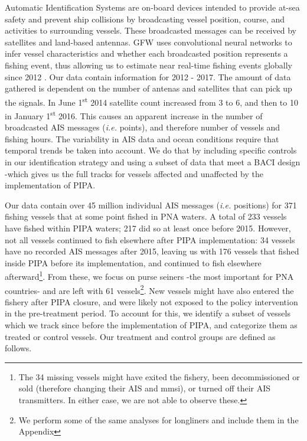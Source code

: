 \documentclass[11pt,]{article}
\let\rmarkdownfootnote\footnote%
\def\footnote{\protect\rmarkdownfootnote}
\begin{document}
Automatic Identification Systems are on-board devices intended to
provide at-sea safety and prevent ship collisions by broadcasting vessel
position, course, and activities to surrounding vessels. These
broadcasted messages can be received by satellites and land-based
antennas. GFW uses convolutional neural networks to infer vessel
characteristics and whether each broadcasted position represents a
fishing event, thus allowing us to estimate near real-time fishing
events globally since 2012 \citep{kroodsma_2018}. Our data contain
information for 2012 - 2017. The amount of data gathered is dependent on
the number of antenas and satellites that can pick up the signals. In
June 1\textsuperscript{st} 2014 satellite count increased from 3 to 6,
and then to 10 in January 1\textsuperscript{st} 2016. This causes an
apparent increase in the number of broadcasted AIS messages (\emph{i.e.}
points), and therefore number of vessels and fishing hours. The
variability in AIS data and ocean conditions require that temporal
trends be taken into account. We do that by including specific controls
in our identification strategy and using a subset of data that meet a
BACI design -which gives us the full tracks for vessels affected and
unaffected by the implementation of PIPA.

Our data contain over 45 million individual AIS messages (\emph{i.e.}
positions) for 371 fishing vessels that at some point fished in PNA
waters. A total of 233 vessels have fished within PIPA waters; 217 did
so at least once before 2015. However, not all vessels continued to fish
elsewhere after PIPA implementation: 34 vessels have no recorded AIS
messages after 2015, leaving us with 176 vessels that fished inside PIPA
before its implementation, and continued to fish elsewhere
afterward\footnote{The 34 missing vessels might have exited the fishery, been decommissioned or sold (therefore changing their AIS and mmsi), or turned off their AIS transmitters. In either case, we are not able to observe these.}.
From these, we focus on purse seiners -the most important for PNA
countries- and are left with 61
vessels\footnote{We perform some of the same analyses for longliners and include them in the Appendix}.
New vessels might have also entered the fishery after PIPA closure, and
were likely not exposed to the policy intervention in the pre-treatment
period. To account for this, we identify a subset of vessels which we
track since before the implementation of PIPA, and categorize them as
treated or control vessels. Our treatment and control groups are defined
as follows.
\end{document}
